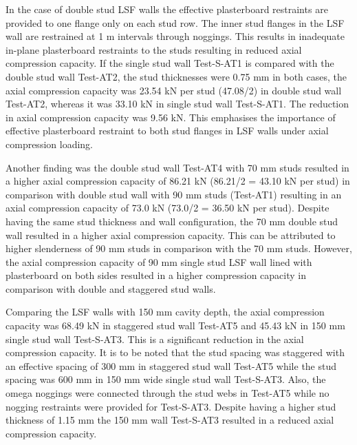 In the case of double stud LSF walls the effective plasterboard restraints are provided to one flange only on each stud row. The inner stud flanges in the LSF wall are restrained at 1 m intervals through noggings. This results in inadequate in-plane plasterboard restraints to the studs resulting in reduced axial compression capacity. If the single stud wall Test-S-AT1 is compared with the double stud wall Test-AT2, the stud thicknesses were 0.75 mm in both cases, the axial compression capacity was 23.54 kN per stud (47.08/2) in double stud wall Test-AT2, whereas it was 33.10 kN in single stud wall Test-S-AT1. The reduction in axial compression capacity was 9.56 kN. This emphasises the importance of effective plasterboard restraint to both stud flanges in LSF walls under axial compression loading.

Another finding was the double stud wall Test-AT4 with 70 mm studs resulted in a higher axial compression capacity of 86.21 kN (86.21/2 = 43.10 kN per stud) in comparison with double stud wall with 90 mm studs (Test-AT1) resulting in an axial compression capacity of 73.0 kN (73.0/2 = 36.50 kN per stud). Despite having the same stud thickness and wall configuration, the 70 mm double stud wall resulted in a higher axial compression capacity. This can be attributed to higher slenderness of 90 mm studs in comparison with the 70 mm studs. However, the axial compression capacity of 90 mm single stud LSF wall lined with plasterboard on both sides resulted in a higher compression capacity in comparison with double and staggered stud walls. 

Comparing the LSF walls with 150 mm cavity depth, the axial compression capacity was 68.49 kN in staggered stud wall Test-AT5 and 45.43 kN in 150 mm single stud wall Test-S-AT3. This is a significant reduction in the axial compression capacity. It is to be noted that the stud spacing was staggered with an effective spacing of 300 mm in staggered stud wall Test-AT5 while the stud spacing was 600 mm in 150 mm wide single stud wall Test-S-AT3. Also, the omega noggings were connected through the stud webs in Test-AT5 while no nogging restraints were provided for Test-S-AT3. Despite having a higher stud thickness of 1.15 mm the 150 mm wall Test-S-AT3 resulted in a reduced axial compression capacity. 

